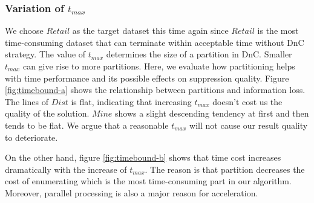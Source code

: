 \subsubsection{Variation of $t_{max}$}\label{sec:eval:timebound}
We choose $Retail$ as the target dataset this time again since $Retail$
is the most time-consuming dataset that can terminate within
acceptable time without DnC strategy.
The value of $t_{max}$ determines the size of a partition in DnC. Smaller
$t_{max}$ can give rise to more partitions. Here, we
evaluate how partitioning helps with time performance and
its possible effects on suppression quality.
Figure \ref{fig:timebound-a} shows the relationship between partitions
and information loss. The lines of  $Dist$ is flat, indicating that
increasing $t_{max}$ doesn't cost us the quality of the solution. $Mine$
shows a slight descending tendency at first and then tends to be flat.
We argue that a reasonable $t_{max}$ will not cause our result quality to
deteriorate.

On the other hand, figure \ref{fig:timebound-b} shows that
time cost increases dramatically  with the increase of  $t_{max}$.
The reason is that  partition  decreases the cost of enumerating \qids which
is the most time-consuming part in our algorithm. Moreover, parallel
processing is also a major reason for acceleration.





